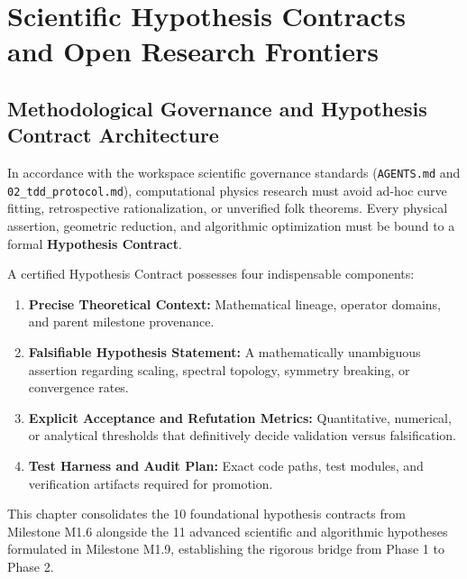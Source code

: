 
\chapter{Scientific Hypothesis Contracts and Open Research Frontiers}
\label{ch:hypothesis_contracts}

\section{Methodological Governance and Hypothesis Contract Architecture}
\label{sec:hyp_contract_governance}

In accordance with the workspace scientific governance standards (\texttt{AGENTS.md} and \texttt{02\_tdd\_protocol.md}), computational physics research must avoid ad-hoc curve fitting, retrospective rationalization, or unverified folk theorems. Every physical assertion, geometric reduction, and algorithmic optimization must be bound to a formal \textbf{Hypothesis Contract}.

A certified Hypothesis Contract possesses four indispensable components:
\begin{enumerate}
\item \textbf{Precise Theoretical Context:} Mathematical lineage, operator domains, and parent milestone provenance.
\item \textbf{Falsifiable Hypothesis Statement:} A mathematically unambiguous assertion regarding scaling, spectral topology, symmetry breaking, or convergence rates.
\item \textbf{Explicit Acceptance and Refutation Metrics:} Quantitative, numerical, or analytical thresholds that definitively decide validation versus falsification.
\item \textbf{Test Harness and Audit Plan:} Exact code paths, test modules, and verification artifacts required for promotion.
\end{enumerate}

This chapter consolidates the 10 foundational hypothesis contracts from Milestone M1.6 alongside the 11 advanced scientific and algorithmic hypotheses formulated in Milestone M1.9, establishing the rigorous bridge from Phase 1 to Phase 2.

